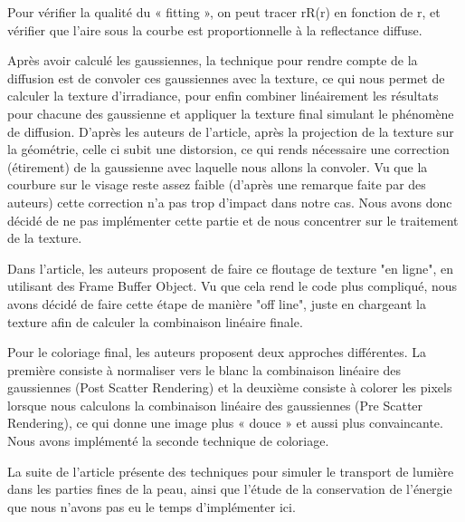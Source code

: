 \documentclass[12pt,a4paper]{article}
\begin{document}
Pour vérifier la qualité du « fitting », on peut tracer rR(r) en fonction de r, et vérifier que l’aire sous la courbe est proportionnelle à la reflectance diffuse.

Après avoir calculé les gaussiennes, la technique pour rendre compte de la diffusion est de convoler ces gaussiennes avec la texture, ce qui nous permet de calculer la texture d’irradiance, pour enfin combiner linéairement les résultats pour chacune des gaussienne et appliquer la texture final simulant le phénomène de diffusion.  D’après les auteurs de l’article, après la projection de la texture sur la géométrie, celle ci subit une distorsion, ce qui rends nécessaire une correction (étirement) de la gaussienne avec laquelle nous allons la convoler. Vu que la courbure sur le visage reste assez faible (d’après une remarque faite par des auteurs)  cette correction n’a pas trop d’impact dans notre cas. Nous avons donc décidé de ne pas implémenter cette partie et de nous concentrer sur le traitement de la texture.

Dans l’article, les auteurs proposent de faire ce floutage de texture  "en ligne", en utilisant des Frame Buffer Object. Vu que cela rend le code plus compliqué, nous avons décidé de faire cette étape de manière "off line", juste en chargeant la texture afin de calculer  la combinaison linéaire finale.

Pour le coloriage final, les auteurs proposent deux approches différentes. La première consiste à normaliser vers le blanc la combinaison linéaire des gaussiennes (Post Scatter Rendering) et la deuxième consiste à colorer les pixels lorsque nous calculons la combinaison linéaire des gaussiennes (Pre Scatter Rendering), ce qui donne une image plus « douce » et aussi plus convaincante. Nous avons implémenté la seconde technique de coloriage.

La suite de l’article présente des techniques pour simuler le transport de lumière dans les parties fines de la peau, ainsi que l’étude de la conservation de l’énergie que nous n’avons pas eu le temps d’implémenter ici.
\end{document}
